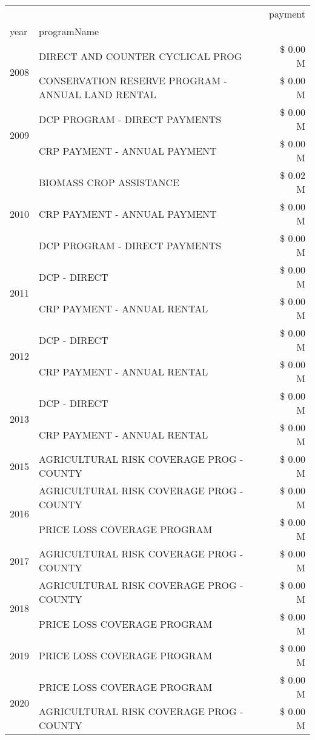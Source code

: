 \begin{tabular}{llr}
\toprule
 &  & payment \\
year & programName &  \\
\midrule
\multirow[t]{2}{*}{2008} & DIRECT AND COUNTER CYCLICAL PROG & \$ 0.00 M \\
 & CONSERVATION RESERVE PROGRAM - ANNUAL LAND RENTAL & \$ 0.00 M \\
\cline{1-3}
\multirow[t]{2}{*}{2009} & DCP PROGRAM - DIRECT PAYMENTS & \$ 0.00 M \\
 & CRP PAYMENT - ANNUAL PAYMENT & \$ 0.00 M \\
\cline{1-3}
\multirow[t]{3}{*}{2010} & BIOMASS CROP ASSISTANCE & \$ 0.02 M \\
 & CRP PAYMENT - ANNUAL PAYMENT & \$ 0.00 M \\
 & DCP PROGRAM - DIRECT PAYMENTS & \$ 0.00 M \\
\cline{1-3}
\multirow[t]{2}{*}{2011} & DCP - DIRECT & \$ 0.00 M \\
 & CRP PAYMENT - ANNUAL RENTAL & \$ 0.00 M \\
\cline{1-3}
\multirow[t]{2}{*}{2012} & DCP - DIRECT & \$ 0.00 M \\
 & CRP PAYMENT - ANNUAL RENTAL & \$ 0.00 M \\
\cline{1-3}
\multirow[t]{2}{*}{2013} & DCP - DIRECT & \$ 0.00 M \\
 & CRP PAYMENT - ANNUAL RENTAL & \$ 0.00 M \\
\cline{1-3}
2015 & AGRICULTURAL RISK COVERAGE PROG - COUNTY & \$ 0.00 M \\
\cline{1-3}
\multirow[t]{2}{*}{2016} & AGRICULTURAL RISK COVERAGE PROG - COUNTY & \$ 0.00 M \\
 & PRICE LOSS COVERAGE PROGRAM & \$ 0.00 M \\
\cline{1-3}
2017 & AGRICULTURAL RISK COVERAGE PROG - COUNTY & \$ 0.00 M \\
\cline{1-3}
\multirow[t]{2}{*}{2018} & AGRICULTURAL RISK COVERAGE PROG - COUNTY & \$ 0.00 M \\
 & PRICE LOSS COVERAGE PROGRAM & \$ 0.00 M \\
\cline{1-3}
2019 & PRICE LOSS COVERAGE PROGRAM & \$ 0.00 M \\
\cline{1-3}
\multirow[t]{2}{*}{2020} & PRICE LOSS COVERAGE PROGRAM & \$ 0.00 M \\
 & AGRICULTURAL RISK COVERAGE PROG - COUNTY & \$ 0.00 M \\
\cline{1-3}
\bottomrule
\end{tabular}
